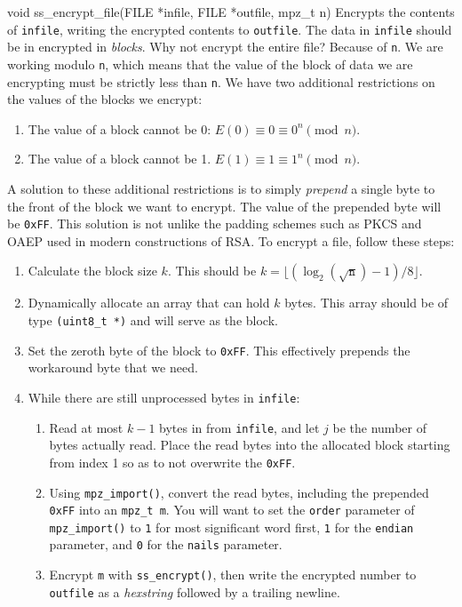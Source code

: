 \begin{funcdoc}{void ss\_encrypt\_file(FILE *infile, FILE *outfile,
mpz\_t n)}
  Encrypts the contents of \texttt{infile}, writing the encrypted
  contents to \texttt{outfile}. The data in \texttt{infile} should be in
  encrypted in \emph{blocks}. Why not encrypt the entire file? Because
  of \texttt{n}. We are working modulo \texttt{n}, which means that the
  value of the block of data we are encrypting must be strictly less
  than \texttt{n}. We have two additional restrictions on the values of
  the blocks we encrypt:
  \begin{enumerate}
    \item The value of a block cannot be 0: $E(0) \equiv 0 \equiv 0^n \pmod{n}$.
    \item The value of a block cannot be 1. $E(1) \equiv 1 \equiv 1^n \pmod{n}$.
  \end{enumerate}
  A solution to these additional restrictions is to simply
  \emph{prepend} a single byte to the front of the block we want to
  encrypt. The value of the prepended byte will be \texttt{0xFF}. This
  solution is not unlike the padding schemes such as PKCS and OAEP used
  in modern constructions of RSA\@. To encrypt a file, follow these
  steps:
  \begin{enumerate}
    \item Calculate the block size $k$. This should be
      $k = \lfloor(\log_2({\sqrt{\texttt{n}}}) - 1) / 8\rfloor$.
    \item Dynamically allocate an array that can hold $k$ bytes. This
      array should be of type \texttt{(uint8\_t *)} and will serve as
      the block.
    \item Set the zeroth byte of the block to \texttt{0xFF}. This
      effectively prepends the workaround byte that we need.
    \item While there are still unprocessed bytes in \texttt{infile}:
      \begin{enumerate}
        \item Read at most $k - 1$ bytes in from \texttt{infile}, and
          let $j$ be the number of bytes actually read. Place the read
          bytes into the allocated block starting from index 1 so as to
          not overwrite the \texttt{0xFF}.
        \item Using \texttt{mpz\_import()}, convert the read bytes,
          including the prepended \texttt{0xFF} into an \texttt{mpz\_t
          m}. You will want to set the \texttt{order} parameter of
          \texttt{mpz\_import()} to \texttt{1} for most significant word
          first, \texttt{1} for the \texttt{endian} parameter, and
          \texttt{0} for the \texttt{nails} parameter.
        \item Encrypt \texttt{m} with \texttt{ss\_encrypt()}, then
          write the encrypted number to \texttt{outfile} as a
          \emph{hexstring} followed by a trailing newline.
      \end{enumerate}
  \end{enumerate}
\end{funcdoc}

